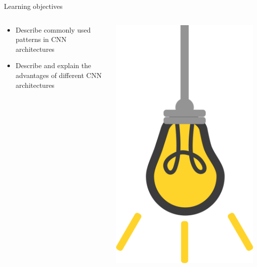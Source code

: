 \documentclass[9pt, aspectratio=169]{beamer}
\begin{document}
\begin{frame}
    {Learning objectives}
    \begin{columns}
        \begin{column}{0.8\textwidth}
            \begin{itemize}
                \item Describe commonly used patterns in CNN architectures
                \item Describe and explain the advantages of different CNN architectures
            \end{itemize}
        \end{column}
        \begin{column}{0.2\textwidth}
            \includegraphics[angle=-30, origin=tr, width=1.5\textwidth]{lightbulb.png}
        \end{column}
    \end{columns}
\end{frame}
\end{document}
